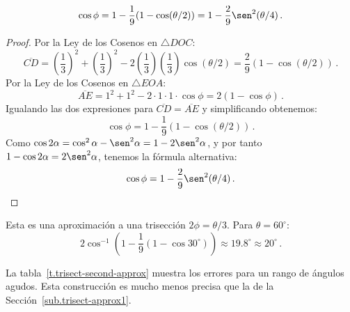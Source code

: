 \begin{theorem}
\[
\cos\phi=1 - \frac{1}{9}(1-\cos(\theta/2))=1 - \frac{2}{9}\sen^2(\theta/4)\,.
\]
\end{theorem}
\begin{proof} Por la Ley de los Cosenos en $\triangle DOC$:
\[
\overline{CD}= \left(\frac{1}{3}\right)^2+\left(\frac{1}{3}\right)^2-2\left(\frac{1}{3}\right)\left(\frac{1}{3}\right)\cos (\theta/2)=\frac{2}{9}(1-\cos(\theta/2))\,.
\]
Por la Ley de los Cosenos en $\triangle EOA$:
\[
\overline{AE} = 1^2+1^2-2\cdot 1\cdot 1\cdot \cos \phi=2(1-\cos \phi)\,.
\]
Igualando las dos expresiones para $\overline{CD}=\overline{AE}$ y simplificando obtenemos:
\[
\cos \phi = 1 - \frac{1}{9}(1-\cos(\theta/2))\,.
\]
Como $\cos 2\alpha= \cos^2 \alpha-\sen^2\alpha=1-2\sen^2\alpha$, y por tanto $1-\cos 2\alpha=2\sen^2\alpha$, tenemos la fórmula alternativa:
\[
\cos \phi = 1 - \frac{2}{9}\sen^2(\theta/4)\,.
\]
\end{proof}

Esta es una aproximación a una trisección $2\phi=\theta/3$. Para $\theta=60^\circ$:
\[
2\cos^{-1}\left(1 - \frac{1}{9}(1-\cos 30^\circ)\right)\approx 19.8^\circ\approx 20^\circ\,.
\]

La tabla~\ref{t.trisect-second-approx} muestra los errores para un rango de ángulos agudos. Esta construcción es mucho menos precisa que la de la Sección~\ref{sub.trisect-approx1}.

